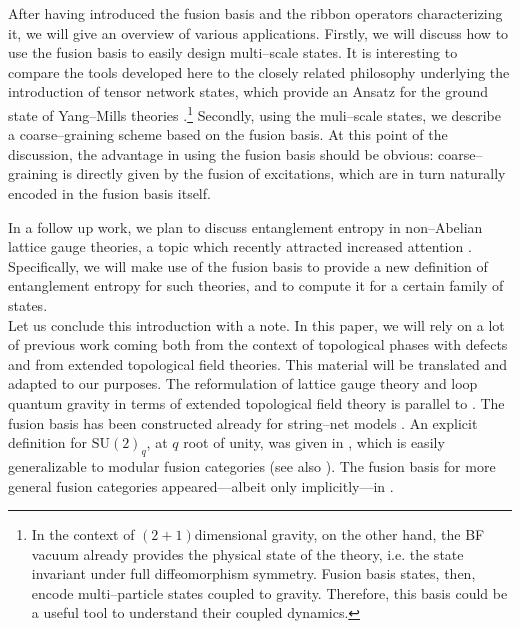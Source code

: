 \documentclass[nofootinbib,superscriptaddress,eqsecnum,tightenlines,11pt]{revtex4-1}
\def\SU{\text{SU}}
\begin{document}
After having introduced the fusion basis and the ribbon operators characterizing it, we will give an overview of various applications.
Firstly, we will discuss how to use the fusion basis to easily design multi--scale states.
It is interesting to compare the tools developed here to the closely related philosophy underlying the introduction of tensor network states, which provide an Ansatz for the ground state of Yang--Mills theories \cite{Ashley}.\footnote{In the context of $(2+1)$dimensional gravity, on the other hand, the BF vacuum already provides the physical state of the theory, i.e. the state invariant under full diffeomorphism symmetry. 
Fusion basis states, then, encode multi--particle states coupled to gravity. Therefore, this basis could be a useful tool to understand their coupled dynamics.}
Secondly, using the muli--scale states, we describe a coarse--graining scheme based on the fusion basis.
 At this point of the discussion, the advantage in using the fusion basis should be obvious: coarse--graining is directly given by the fusion of excitations, which are in turn naturally encoded in the fusion basis itself. 

In a follow up work, we plan to discuss entanglement entropy in non--Abelian lattice gauge theories, a topic which recently attracted increased attention \cite{GaugeEnt}. Specifically, we will make use of the fusion basis to provide a new definition of entanglement entropy for such theories, and to compute it for a certain family of states. \\


Let us conclude this introduction with a note.
In this paper, we will rely on a lot of previous work coming both from the context of topological phases with defects and from extended topological field theories. This material will be translated and adapted to our purposes. The reformulation of lattice gauge theory and loop quantum gravity in terms of extended topological field theory is parallel to \cite{Kir,BalKir,DG16}. The fusion basis has been constructed already for string--net models \cite{LevinWen}. An explicit definition for $\SU(2)_q$, at  $q$ root of unity, was given in \cite{KKR}, which is easily generalizable to modular fusion categories (see also \cite{DG16}). The fusion basis  for more general fusion categories appeared---albeit only implicitly---in \cite{Hu}.
\end{document}
